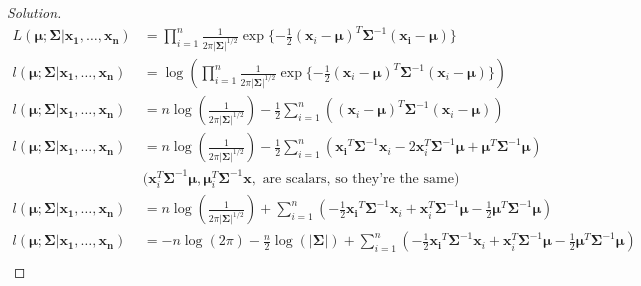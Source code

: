 \documentclass{article}
\newenvironment{solution}
  {\renewcommand\qedsymbol{$\blacksquare$}\begin{proof}[Solution]$ $}
  {\end{proof}}
\newcommand{\vect}[1]{\boldsymbol{#1}}
\begin{document}
\begin{Exercise}
    \begin{solution}
        \begin{align*}
            L(\vect{\mu}; \vect{\vect{\Sigma}}|\vect{x_1},\ldots,\vect{x_n}) & = \prod_{i=1}^{n}\frac{1}{2\pi|\vect{\Sigma}|^{1/2}}\exp\{-\frac{1}{2} (\vect{x}_i-\vect{\mu})^T \vect{\Sigma}^{-1} (\vect {x_i} -\vect \mu)\}                                                                            \\
            l(\vect{\mu}; \vect{\vect{\Sigma}}|\vect{x_1},\ldots,\vect{x_n}) & = \log(\prod_{i=1}^{n}\frac{1}{2\pi|\vect{\Sigma}|^{1/2}}\exp\{-\frac{1}{2} (\vect{x}_i-\vect{\mu})^T \vect{\Sigma}^{-1} (\vect{x}_i -\vect \mu)\})                                                                       \\
            l(\vect{\mu}; \vect{\vect{\Sigma}}|\vect{x_1},\ldots,\vect{x_n}) & = n \log(\frac{1}{2\pi|\vect{\Sigma}|^{1/2}})-\frac{1}{2}\sum_{i=1}^n ((\vect{x}_i-\vect{\mu})^T \vect{\Sigma}^{-1} (\vect{x}_i -\vect \mu))                                                                              \\
            l(\vect{\mu}; \vect{\vect{\Sigma}}|\vect{x_1},\ldots,\vect{x_n}) & = n \log(\frac{1}{2\pi|\vect{\Sigma}|^{1/2}})-\frac{1}{2}\sum_{i=1}^n (\vect {x_i}^T\vect{\Sigma}^{-1}\vect{x}_i - 2\vect{x}_i^T\vect{\Sigma}^{-1}\vect{\mu} + \vect{\mu}^T \vect{\Sigma}^{-1}\vect{\mu})                 \\
                                                                             & \text{(}\vect{x}_i^T \vect{\Sigma}^{-1}\vect{\mu}, \vect{\mu}_i^T \vect{\Sigma}^{-1}\vect{x},\text{ are scalars, so they're the same}\text{)}                                                                             \\
            l(\vect{\mu}; \vect{\vect{\Sigma}}|\vect{x_1},\ldots,\vect{x_n}) & = n \log(\frac{1}{2\pi|\vect{\Sigma}|^{1/2}})+\sum_{i=1}^n (-\frac{1}{2}\vect {x_i}^T\vect{\Sigma}^{-1}\vect{x}_i + \vect{x}_i^T\vect{\Sigma}^{-1}\vect{\mu} - \frac{1}{2} \vect{\mu}^T \vect{\Sigma}^{-1}\vect{\mu})     \\
            l(\vect{\mu}; \vect{\vect{\Sigma}}|\vect{x_1},\ldots,\vect{x_n}) & = -n\log(2\pi) - \frac{n}{2}\log(\vect{|\Sigma}|)+\sum_{i=1}^n (-\frac{1}{2}\vect {x_i}^T\vect{\Sigma}^{-1}\vect{x}_i + \vect{x}_i^T\vect{\Sigma}^{-1}\vect{\mu} - \frac{1}{2} \vect{\mu}^T \vect{\Sigma}^{-1}\vect{\mu}) \\
        \end{align*}


\end{solution}
\end{Exercise}
\end{document}
